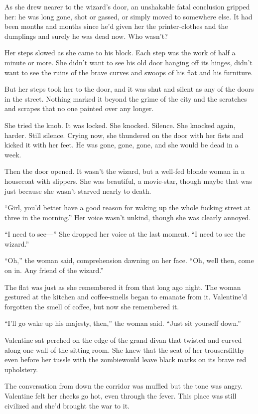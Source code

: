 As she drew nearer to the wizard’s door, an unshakable fatal
conclusion gripped her: he was long gone, shot or gassed, or simply
moved to somewhere else. It had been months and months since he’d
given her the printer-clothes and the dumplings and surely he was
dead now. Who wasn’t?

Her steps slowed as she came to his block. Each step was the work
of half a minute or more. She didn’t want to see his old door
hanging off its hinges, didn’t want to see the ruins of the brave
curves and swoops of his flat and his furniture.

But her steps took her to the door, and it was shut and silent as
any of the doors in the street. Nothing marked it beyond the grime
of the city and the scratches and scrapes that no one painted over
any longer.

She tried the knob. It was locked. She knocked. Silence. She
knocked again, harder. Still silence. Crying now, she thundered on
the door with her fists and kicked it with her feet. He was gone,
gone, gone, and she would be dead in a week.

Then the door opened. It wasn’t the wizard, but a well-fed blonde
woman in a housecoat with slippers. She was beautiful, a
movie-star, though maybe that was just because she wasn’t starved
nearly to death.

“Girl, you’d better have a good reason for waking up the whole
fucking street at three in the morning.” Her voice wasn’t unkind,
though she was clearly annoyed.

“I need to see---” She dropped her voice at the last moment. “I need
to see the wizard.”

“Oh,” the woman said, comprehension dawning on her face. “Oh, well
then, come on in. Any friend of the wizard.”

The flat was just as she remembered it from that long ago night.
The woman gestured at the kitchen and coffee-smells began to
emanate from it. Va\-len\-tine’d forgotten the smell of coffee, but now
she remembered it.

“I’ll go wake up his majesty, then,” the woman said. “Just sit
yourself down.”

Valentine sat perched on the edge of the grand divan that twisted
and curved along one wall of the sitting room. She knew that the
seat of her trousers\dash{}filthy even before her tussle with the
zombie\dash{}would leave black marks on its brave red upholstery.

The conversation from down the corridor was muffled but the tone
was angry. Valentine felt her cheeks go hot, even through the
fever. This place was still civilized and she’d brought the war to
it.

